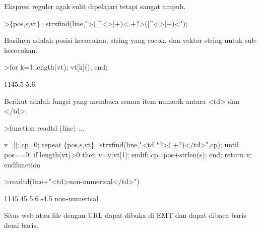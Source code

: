 \documentclass[a4paper,10pt]{article}
\begin{document}
\begin{eulernotebook}
\begin{eulercomment}
\begin{eulercomment}
\begin{eulercomment}
Ekspresi reguler agak sulit dipelajari tetapi sangat ampuh.
\end{eulercomment}
\begin{eulerprompt}
>\{pos,s,vt\}=strxfind(line,">([^<>]+)<.+?>([^<>]+)<");
\end{eulerprompt}
\begin{eulercomment}
Hasilnya adalah posisi kecocokan, string yang cocok, dan vektor string
untuk sub-kecocokan.
\end{eulercomment}
\begin{eulerprompt}
>for k=1:length(vt); vt[k](), end;
\end{eulerprompt}
\begin{euleroutput}
  1145.5
  5.6
\end{euleroutput}
\begin{eulercomment}
Berikut adalah fungsi yang membaca semua item numerik antara \textless{}td\textgreater{} dan
\textless{}/td\textgreater{}.
\end{eulercomment}
\begin{eulerprompt}
>function readtd (line) ...
\end{eulerprompt}
\begin{eulerudf}
  v=[]; cp=0;
  repeat
     \{pos,s,vt\}=strxfind(line,"<td.*?>(.+?)</td>",cp);
     until pos==0;
     if length(vt)>0 then v=v|vt[1]; endif;
     cp=pos+strlen(s);
  end;
  return v;
  endfunction
\end{eulerudf}
\begin{eulerprompt}
>readtd(line+"<td>non-numerical</td>")
\end{eulerprompt}
\begin{euleroutput}
  1145.45
  5.6
  -4.5
  non-numerical
\end{euleroutput}
\begin{eulercomment}
Situs web atau file dengan URL dapat dibuka di EMT dan dapat dibaca
baris demi baris.


\end{eulercomment}
\end{eulercomment}
\end{eulercomment}
\end{eulernotebook}
\end{document}
